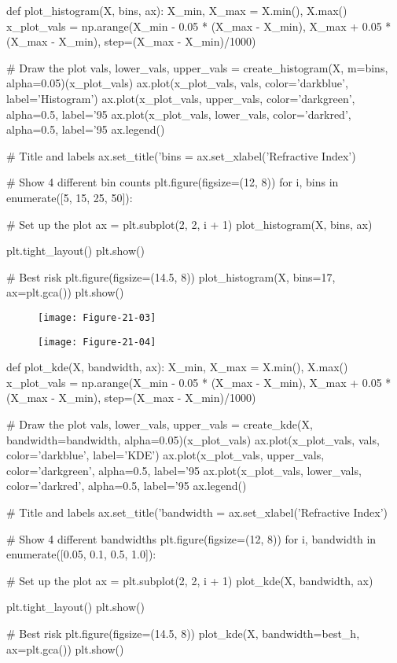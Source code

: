\begin{python}
def plot_histogram(X, bins, ax):
    X_min, X_max = X.min(), X.max()
    x_plot_vals = np.arange(X_min - 0.05 * (X_max - X_min), X_max + 0.05 * (X_max - X_min), step=(X_max - X_min)/1000)
    
    # Draw the plot
    vals, lower_vals, upper_vals = create_histogram(X, m=bins, alpha=0.05)(x_plot_vals)
    ax.plot(x_plot_vals, vals, color='darkblue', label='Histogram')
    ax.plot(x_plot_vals, upper_vals, color='darkgreen', alpha=0.5, label='95%
    ax.plot(x_plot_vals, lower_vals, color='darkred', alpha=0.5, label='95%
    ax.legend()
    
    # Title and labels
    ax.set_title('bins = %
    ax.set_xlabel('Refractive Index')

    
# Show 4 different bin counts
plt.figure(figsize=(12, 8))
for i, bins in enumerate([5, 15, 25, 50]):
    
    # Set up the plot
    ax = plt.subplot(2, 2, i + 1)
    plot_histogram(X, bins, ax)

plt.tight_layout()
plt.show()

# Best risk
plt.figure(figsize=(14.5, 8))
plot_histogram(X, bins=17, ax=plt.gca())
plt.show()
\end{python}

\begin{figure}[H]
\texttt{[image: Figure-21-03]}
\end{figure}

\begin{figure}[H]
\texttt{[image: Figure-21-04]}
\end{figure}

\begin{python}
def plot_kde(X, bandwidth, ax):
    X_min, X_max = X.min(), X.max()
    x_plot_vals = np.arange(X_min - 0.05 * (X_max - X_min), X_max + 0.05 * (X_max - X_min), step=(X_max - X_min)/1000)
      
    # Draw the plot
    vals, lower_vals, upper_vals = create_kde(X, bandwidth=bandwidth, alpha=0.05)(x_plot_vals)
    ax.plot(x_plot_vals, vals, color='darkblue', label='KDE')
    ax.plot(x_plot_vals, upper_vals, color='darkgreen', alpha=0.5, label='95%
    ax.plot(x_plot_vals, lower_vals, color='darkred', alpha=0.5, label='95%
    ax.legend()
    
    # Title and labels
    ax.set_title('bandwidth = %
    ax.set_xlabel('Refractive Index')    

# Show 4 different bandwidths
plt.figure(figsize=(12, 8))
for i, bandwidth in enumerate([0.05, 0.1, 0.5, 1.0]):
    
    # Set up the plot
    ax = plt.subplot(2, 2, i + 1)
    plot_kde(X, bandwidth, ax)

plt.tight_layout()
plt.show()

# Best risk
plt.figure(figsize=(14.5, 8))
plot_kde(X, bandwidth=best_h, ax=plt.gca())
plt.show()
\end{python}

